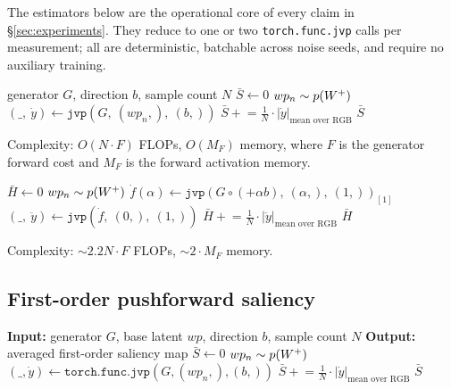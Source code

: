 
The estimators below are the operational core of every claim in
§\ref{sec:experiments}. They reduce to one or two
\texttt{torch.func.jvp} calls per measurement; all are deterministic,
batchable across noise seeds, and require no auxiliary training.

\begin{algorithm}
\caption{First-order per-pixel saliency
$\bar S^{(1)}(b)$ via forward-mode JVP}
\label{alg:c1-fwd}
\begin{algorithmic}[1]
\REQUIRE generator $G$, direction $b$, sample count $N$
\STATE $\bar S \leftarrow 0$
  \STATE $wp_n \sim p(W^+)$
  \STATE $(\_,\ \dot y) \leftarrow \texttt{jvp}(G,\ (wp_n,),\ (b,))$
  \STATE $\bar S \mathrel{+}\!=
          \tfrac{1}{N}\!\cdot\!|\dot y|_{\text{mean over RGB}}$
\ENDFOR
\RETURN $\bar S$
\end{algorithmic}
Complexity: $O(N \cdot F)$ FLOPs, $O(M_F)$ memory, where $F$ is the
generator forward cost and $M_F$ is the forward activation memory.
\end{algorithm}

\begin{algorithm}
\caption{Second-order per-pixel saliency $\bar S^{(2)}(b)$ via
composed forward-mode JVP}
\label{alg:c1-c2}
\begin{algorithmic}[1]
\STATE $\bar H \leftarrow 0$
  \STATE $wp_n \sim p(W^+)$
  \STATE $\dot f(\alpha) \leftarrow
          \texttt{jvp}(G \circ (+\alpha b),\ (\alpha,),\ (1,))_{[1]}$
  \STATE $(\_,\ \ddot y) \leftarrow
          \texttt{jvp}(\dot f,\ (0,),\ (1,))$
  \STATE $\bar H \mathrel{+}\!=
          \tfrac{1}{N}\!\cdot\!|\ddot y|_{\text{mean over RGB}}$
\ENDFOR
\RETURN $\bar H$
\end{algorithmic}
Complexity: $\sim\!2.2 N \cdot F$ FLOPs, $\sim\!2 \cdot M_F$ memory.
\end{algorithm}

\subsection{First-order pushforward saliency}
\begin{algorithmic}
\STATE \textbf{Input:} generator $G$, base latent $wp$, direction $b$, sample count $N$
\STATE \textbf{Output:} averaged first-order saliency map
\STATE
\STATE $\bar S \leftarrow 0$
  \STATE $wp_n \sim p(W^+)$
  \STATE $(\_, \dot y) \leftarrow \texttt{torch.func.jvp}(G, (wp_n,), (b,))$
  \STATE $\bar S \mathrel{+}= \tfrac{1}{N} \cdot |\dot y|_{\text{mean over RGB}}$
\ENDFOR
\RETURN $\bar S$
\end{algorithmic}

